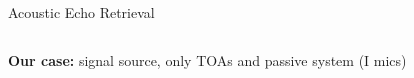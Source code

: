 \begin{frame}[t]{Acoustic Echo Retrieval}
\begin{columns}[T,onlytextwidth]
    \end{columns}

    \pause[6]
    \vfill
    \textcolor{myred}{\textbf{Our case:} signal source, only TOAs and passive system (I mics)}

\end{frame}

